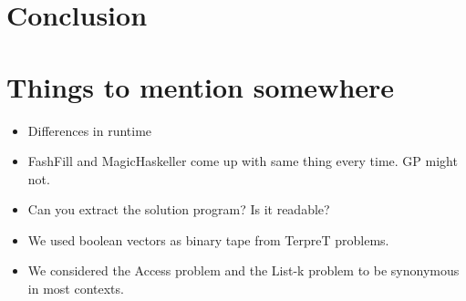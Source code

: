 \section{Conclusion}


\section{Things to mention somewhere}
\begin{itemize}
 \item Differences in runtime
 \item FashFill and MagicHaskeller come up with same thing every time. GP might not.
 \item Can you extract the solution program? Is it readable?
 \item We used boolean vectors as binary tape from TerpreT problems.
 \item We considered the Access problem and the List-k problem to be synonymous in most contexts.
\end{itemize}